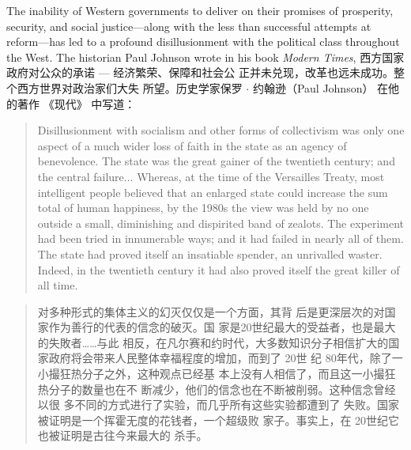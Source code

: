 \begin{paracol}{2}
The inability of Western governments to deliver on their
promises of prosperity, security, and social justice---along with
the less than successful attempts at reform---has led to a profound disillusionment with the political class throughout the
West. The historian Paul Johnson wrote in his book \textit{Modern Times},
\switchcolumn
西方国家政府对公众的承诺 --- 经济繁荣、保障和社会公
正并未兑现，改革也远未成功。整个西方世界对政治家们大失
所望。历史学家保罗 $\cdot$ 约翰逊（Paul Johnson） 在他的著作
《现代》 中写道：
\switchcolumn*
\begin{quote}
	Disillusionment with socialism and other forms of collectivism
	was only one aspect of a much wider loss of faith in the state as an
	agency of benevolence. The state was the great gainer of the
	twentieth century; and the central failure$\ldots$ Whereas, at the
	time of the Versailles Treaty, most intelligent people believed that
	an enlarged state could increase the sum total of human happiness, by the 1980s the view was held by no one outside a small,
	diminishing and dispirited band of zealots. The experiment had
	been tried in innumerable ways; and it had failed in nearly all of
	them. The state had proved itself an insatiable spender, an unrivalled waster. Indeed, in the twentieth century it had also proved
	itself the great killer of all time.
\end{quote}

\switchcolumn
\begin{quote}
	对多种形式的集体主义的幻灭仅仅是一个方面，其背
	后是更深层次的对国家作为善行的代表的信念的破灭。国
	家是20世纪最大的受益者，也是最大的失敗者……与此
	相反，在凡尔赛和约时代，大多数知识分子相信扩大的国家政府将会带来人民整体幸福程度的增加，而到了 20世
	纪 80年代，除了一小撮狂热分子之外，这种观点已经基
	本上没有人相信了，而且这一小撮狂热分子的数量也在不
	断减少，他们的信念也在不断被削弱。这种信念曾经以很
	多不同的方式进行了实验，而几乎所有这些实验都遭到了
	失败。国家被证明是一个挥霍无度的花钱者，一个超级败
	家子。事实上，在 20世纪它也被证明是古往今来最大的
	杀手。
\end{quote}


\end{paracol}
